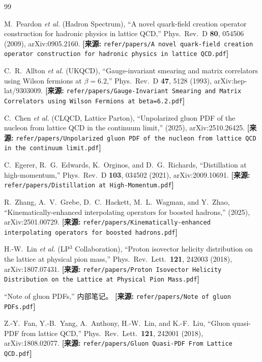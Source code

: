 \documentclass[12pt,a4paper]{ctexart}
\theoremstyle{definition}
\begin{document}
\begin{thebibliography}{99}

M.~Peardon \textit{et al.} (Hadron Spectrum),
``A novel quark-field creation operator construction for hadronic physics in lattice QCD,''
Phys.\ Rev.\ D \textbf{80}, 054506 (2009), arXiv:0905.2160.
\quad\textbf{[来源:} \texttt{refer/papers/A novel quark-field creation operator construction for hadronic physics in lattice QCD.pdf}\textbf{]}

C.~R.~Allton \textit{et al.} (UKQCD),
``Gauge-invariant smearing and matrix correlators using Wilson fermions at $\beta=6.2$,''
Phys.\ Rev.\ D \textbf{47}, 5128 (1993), arXiv:hep-lat/9303009.
\quad\textbf{[来源:} \texttt{refer/papers/Gauge-Invariant Smearing and Matrix Correlators using Wilson Fermions at beta=6.2.pdf}\textbf{]}

C.~Chen \textit{et al.} (CLQCD, Lattice Parton),
``Unpolarized gluon PDF of the nucleon from lattice QCD in the continuum limit,''
(2025), arXiv:2510.26425.
\quad\textbf{[来源:} \texttt{refer/papers/Unpolarized gluon PDF of the nucleon from lattice QCD in the continuum limit.pdf}\textbf{]}

C.~Egerer, R.~G.~Edwards, K.~Orginos, and D.~G.~Richards,
``Distillation at high-momentum,''
Phys.\ Rev.\ D \textbf{103}, 034502 (2021), arXiv:2009.10691.
\quad\textbf{[来源:} \texttt{refer/papers/Distillation at High-Momentum.pdf}\textbf{]}

R.~Zhang, A.~V.~Grebe, D.~C.~Hackett, M.~L.~Wagman, and Y.~Zhao,
``Kinematically-enhanced interpolating operators for boosted hadrons,''
(2025), arXiv:2501.00729.
\quad\textbf{[来源:} \texttt{refer/papers/Kinematically-enhanced interpolating operators for boosted hadrons.pdf}\textbf{]}

H.-W.~Lin \textit{et al.} (LP$^3$ Collaboration),
``Proton isovector helicity distribution on the lattice at physical pion mass,''
Phys.\ Rev.\ Lett.\ \textbf{121}, 242003 (2018), arXiv:1807.07431.
\quad\textbf{[来源:} \texttt{refer/papers/Proton Isovector Helicity Distribution on the Lattice at Physical Pion Mass.pdf}\textbf{]}

``Note of gluon PDFs,''
内部笔记。
\quad\textbf{[来源:} \texttt{refer/papers/Note of gluon PDFs.pdf}\textbf{]}

Z.-Y.~Fan, Y.-B.~Yang, A.~Anthony, H.-W.~Lin, and K.-F.~Liu,
``Gluon quasi-PDF from lattice QCD,''
Phys.\ Rev.\ Lett.\ \textbf{121}, 242001 (2018), arXiv:1808.02077.
\quad\textbf{[来源:} \texttt{refer/papers/Gluon Quasi-PDF From Lattice QCD.pdf}\textbf{]}


\end{thebibliography}
\end{document}
